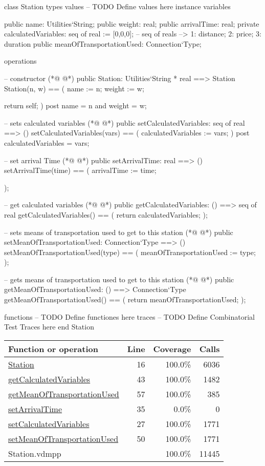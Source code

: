 \begin{vdmpp}[breaklines=true]
class Station
types
values
-- TODO Define values here
instance variables
 
 public name: Utilities`String;
 public weight: real;
 public arrivalTime: real;
 private calculatedVariables: seq of real := [0,0,0]; -- seq of reals --> 1: distance; 2: price; 3: duration
 public meanOfTransportationUsed: Connection`Type;
 
operations
 
 -- constructor
(*@
\label{Station:16}
@*)
 public Station: Utilities`String * real ==> Station
 Station(n, w) ==
 (
  name := n;
  weight := w;
  
  return self;
 )
 post name = n and weight = w;
 
 -- sets calculated variables 
(*@
\label{setCalculatedVariables:27}
@*)
 public setCalculatedVariables: seq of real ==> ()
 setCalculatedVariables(vars) ==
 (
  calculatedVariables := vars;
 )
 post calculatedVariables = vars;
 
 -- set arrival Time
(*@
\label{setArrivalTime:35}
@*)
 public setArrivalTime: real ==> ()
 setArrivalTime(time) ==
 (
  arrivalTime := time;
  
 );
  
 -- get calculated variables
(*@
\label{getCalculatedVariables:43}
@*)
 public getCalculatedVariables: () ==> seq of real
 getCalculatedVariables() ==
 (
  return calculatedVariables;
 );
 
 -- sets means of transportation used to get to this station
(*@
\label{setMeanOfTransportationUsed:50}
@*)
 public setMeanOfTransportationUsed: Connection`Type ==> ()
 setMeanOfTransportationUsed(type) ==
 (
  meanOfTransportationUsed := type;
 );
 
 -- gets means of transportation used to get to this station
(*@
\label{getMeanOfTransportationUsed:57}
@*)
 public getMeanOfTransportationUsed: () ==> Connection`Type
 getMeanOfTransportationUsed() ==
 (
  return meanOfTransportationUsed;
 );

 
functions
-- TODO Define functiones here
traces
-- TODO Define Combinatorial Test Traces here
end Station
\end{vdmpp}
\bigskip
\begin{longtable}{|l|r|r|r|}
\hline
Function or operation & Line & Coverage & Calls \\
\hline
\hline
\hyperref[Station:16]{Station} & 16&100.0\% & 6036 \\
\hline
\hyperref[getCalculatedVariables:43]{getCalculatedVariables} & 43&100.0\% & 1482 \\
\hline
\hyperref[getMeanOfTransportationUsed:57]{getMeanOfTransportationUsed} & 57&100.0\% & 385 \\
\hline
\hyperref[setArrivalTime:35]{setArrivalTime} & 35&0.0\% & 0 \\
\hline
\hyperref[setCalculatedVariables:27]{setCalculatedVariables} & 27&100.0\% & 1771 \\
\hline
\hyperref[setMeanOfTransportationUsed:50]{setMeanOfTransportationUsed} & 50&100.0\% & 1771 \\
\hline
\hline
Station.vdmpp & & 100.0\% & 11445 \\
\hline
\end{longtable}

